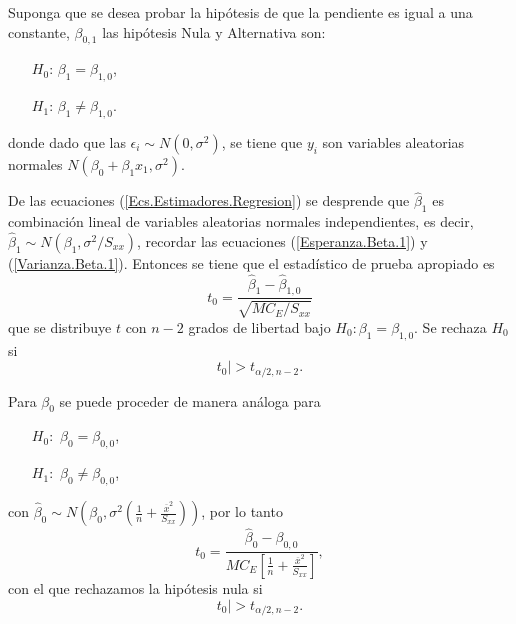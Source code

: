 Suponga que se desea probar la hip\'otesis de que la pendiente es igual a una constante, $\beta_{0,1}$ las hip\'otesis Nula y Alternativa son:
\begin{centering}
\begin{itemize}
\item[$H_{0}$: ] $\beta_{1}=\beta_{1,0}$,

\item[$H_{1}$: ]$\beta_{1}\neq\beta_{1,0}$.

\end{itemize}
donde dado que las $\epsilon_{i} \sim N\left(0,\sigma^{2}\right)$, se tiene que $y_{i}$ son variables aleatorias normales $N\left(\beta_{0}+\beta_{1}x_{1},\sigma^{2}\right)$. 
\end{centering}





De las ecuaciones (\ref{Ecs.Estimadores.Regresion}) se desprende que $\hat{\beta}_{1}$ es combinaci\'on lineal de variables aleatorias normales independientes, es decir, $\hat{\beta}_{1}\sim N\left(\beta_{1},\sigma^{2}/S_{xx}\right)$, recordar las ecuaciones (\ref{Esperanza.Beta.1}) y (\ref{Varianza.Beta.1}).
Entonces se tiene que el estad\'istico de prueba apropiado es
\begin{equation}\label{Estadistico.Beta.1}
t_{0}=\frac{\hat{\beta}_{1}-\hat{\beta}_{1,0}}{\sqrt{MC_{E}/S_{xx}}}
\end{equation}
que se distribuye $t$ con $n-2$ grados de libertad bajo $H_{0}:\beta_{1}=\beta_{1,0}$. Se rechaza $H_{0}$ si 
\begin{equation}\label{Zona.Rechazo.Beta.1}
t_{0}|>t_{\alpha/2,n-2}.
\end{equation}







Para $\beta_{0}$ se puede proceder de manera an\'aloga para
\begin{itemize}
\item[$H_{0}:$] $\beta_{0}=\beta_{0,0}$,
\item[$H_{1}:$] $\beta_{0}\neq\beta_{0,0}$,
\end{itemize}
con $\hat{\beta}_{0}\sim N\left(\beta_{0},\sigma^{2}\left(\frac{1}{n}+\frac{\overline{x}^{2}}{S_{xx}}\right)\right)$, por lo tanto
\begin{equation}\label{Estadistico.Beta.0}
t_{0}=\frac{\hat{\beta}_{0}-\beta_{0,0}}{MC_{E}\left[\frac{1}{n}+\frac{\overline{x}^{2}}{S_{xx}}\right]},
\end{equation}
con el que rechazamos la hip\'otesis nula si
\begin{equation}\label{Zona.Rechazo.Beta.0}
t_{0}|>t_{\alpha/2,n-2}.
\end{equation}






